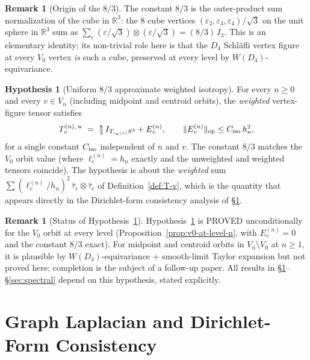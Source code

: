 \documentclass[11pt, a4paper]{amsart}
\theoremstyle{definition}
\newtheorem{remark}[theorem]{Remark}
\newtheorem{hypothesis}[theorem]{Hypothesis}
\newcommand{\R}{\mathbb{R}}
\begin{document}
\begin{remark}[Origin of the $8/3$]
\label{rmk:origin-83}
The constant $8/3$ is the outer-product sum normalization of the
cube in $\R^3$: the $8$ cube vertices $(\varepsilon_2,
\varepsilon_3, \varepsilon_4)/\sqrt{3}$ on the unit sphere in
$\R^3$ sum as
$\sum_\varepsilon (\varepsilon/\sqrt{3}) \otimes
(\varepsilon/\sqrt{3}) = (8/3)\,I_3$. This is an elementary
identity; its non-trivial role here is that the $D_4$ Schl\"{a}fli
vertex figure at every $V_0$ vertex \emph{is} such a cube,
preserved at every level by $W(D_4)$-equivariance.
\end{remark}

\begin{hypothesis}[Uniform $8/3$ approximate weighted isotropy]
\label{hyp:isotropy}
For every $n \geq 0$ and every $v \in V_n$ (including midpoint
and centroid orbits), the \emph{weighted} vertex-figure tensor
satisfies
\[
  T_v^{(n),\,\rm w} \;=\; \tfrac{8}{3}\,I_{T_{\iota_n(v)} S^3}
    + E_v^{(n)},
  \qquad \|E_v^{(n)}\|_{\rm op} \leq C_{\rm iso}\,h_n^2,
\]
for a single constant $C_{\rm iso}$ independent of $n$ and $v$.
The constant $8/3$ matches the $V_0$ orbit value (where
$\ell_e^{(n)} = h_n$ exactly and the unweighted and weighted
tensors coincide). The hypothesis is about the \emph{weighted}
sum $\sum (\ell_e^{(n)}/h_n)^2\,\widehat{\tau}_e \otimes
\widehat{\tau}_e$ of Definition~\ref{def:T-v}, which is the
quantity that appears directly in the Dirichlet-form
consistency analysis of \S\ref{sec:laplacian}.
\end{hypothesis}

\begin{remark}[Status of Hypothesis~\ref{hyp:isotropy}]
\label{rmk:hyp-status}
Hypothesis~\ref{hyp:isotropy} is PROVED unconditionally for the
$V_0$ orbit at every level (Proposition~\ref{prop:v0-at-level-n},
with $E_v^{(n)} = 0$ and the constant $8/3$ exact).
For midpoint and centroid
orbits in $V_n \setminus V_0$ at $n \geq 1$, it is plausible by
$W(D_4)$-equivariance + smooth-limit Taylor expansion but not
proved here; completion is the subject of a follow-up paper.
All results in \S\ref{sec:laplacian}--\S\ref{sec:spectral}
depend on this hypothesis, stated explicitly.
\end{remark}

\section{Graph Laplacian and Dirichlet-Form Consistency}
\label{sec:laplacian}
\end{document}
